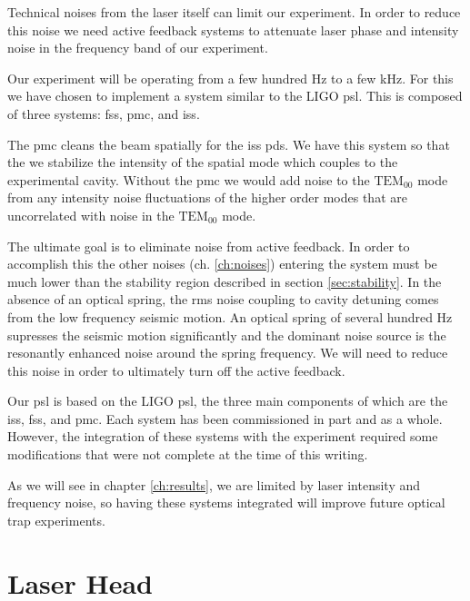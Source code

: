 \acresetall

Technical noises from the laser itself can limit our experiment. \cite{Corbitt07}
In order to reduce this noise we need active feedback systems to attenuate laser
phase and intensity noise in the frequency band of our experiment.

Our experiment will be operating from a few hundred Hz to a few kHz.
For this we have chosen to implement a system similar to the LIGO \ac{psl}.
This is composed of three systems: \ac{fss}, \ac{pmc}, and \ac{iss}.

The \ac{pmc} cleans the beam spatially for the \ac{iss} \ac{pd}s.
We have this system so that the we stabilize the intensity of the spatial mode
which couples to the experimental cavity.
Without the \ac{pmc} we would add noise to the $\mathrm{TEM}_{00}$ mode from any
intensity noise fluctuations of the higher order modes that are uncorrelated
with noise in the $\mathrm{TEM}_{00}$ mode.

The ultimate goal is to eliminate noise from active feedback.
In order to accomplish this the other noises
(ch. \ref{ch:noises}) entering the system must be much lower than the stability
region described in section \ref{sec:stability}.
In the absence of an optical spring, the rms noise coupling to cavity detuning
comes from the low frequency seismic motion.
An optical spring of several hundred Hz supresses the seismic motion
significantly and the dominant noise source is the resonantly enhanced noise
around the spring frequency.
We will need to reduce this noise in order to ultimately turn off the active
feedback.

Our \ac{psl} is based on the LIGO \ac{psl}, the three main components of which
are the \ac{iss}, \ac{fss}, and \ac{pmc}. Each system has been commissioned in
part and as a whole. However, the integration of these systems with the
experiment required some modifications that were not complete at the time of
this writing.

As we will see in chapter \ref{ch:results}, we are limited by laser intensity
and frequency noise, so having these systems integrated will improve
future optical trap experiments.


\section{Laser Head}

